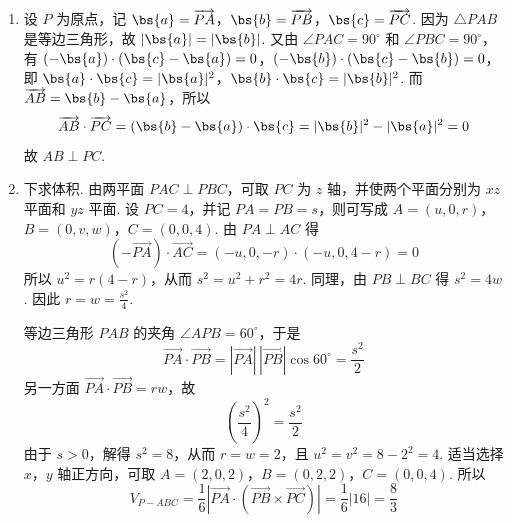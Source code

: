 \begin{solution}
\begin{enumerate}
\item 设 \(P\) 为原点，记
\(\bs{a}=\overrightarrow{PA}\)，\(\bs{b}=\overrightarrow{PB}\)，\(\bs{c}=\overrightarrow{PC}\).
因为 \(\triangle PAB\) 是等边三角形，故 \(|\bs{a}|=|\bs{b}|\). 又由 \(\angle PAC=90^{\circ}\) 和 \(\angle PBC=90^{\circ}\)，有
\((-\bs{a})\cdot(\bs{c}-\bs{a})=0\)，\((-\bs{b})\cdot(\bs{c}-\bs{b})=0\)，
即
\(\bs{a}\cdot\bs{c}=|\bs{a}|^2\)，\(\bs{b}\cdot\bs{c}=|\bs{b}|^2\).
而 \(\overrightarrow{AB}=\bs{b}-\bs{a}\)，所以
\[
\overrightarrow{AB}\cdot\overrightarrow{PC}=(\bs{b}-\bs{a})\cdot\bs{c}=|\bs{b}|^2-|\bs{a}|^2=0
\]
故 \(AB\perp PC\).

\item 下求体积. 由两平面 \(PAC\perp PBC\)，可取 \(PC\) 为 \(z\) 轴，并使两个平面分别为 \(xz\) 平面和 \(yz\) 平面. 设 \(PC=4\)，并记 \(PA=PB=s\)，则可写成
\(A=(u,0,r)\)，\(B=(0,v,w)\)，\(C=(0,0,4)\).
由 \(PA\perp AC\) 得
\[
(-\overrightarrow{PA})\cdot\overrightarrow{AC}=(-u,0,-r)\cdot(-u,0,4-r)=0
\]
所以 \(u^2=r(4-r)\)，从而 \(s^2=u^2+r^2=4r\). 同理，由 \(PB\perp BC\) 得 \(s^2=4w\). 因此 \(r=w=\frac{s^2}{4}\).

等边三角形 \(PAB\) 的夹角 \(\angle APB=60^{\circ}\)，于是
\[
\overrightarrow{PA}\cdot\overrightarrow{PB}=|\overrightarrow{PA}|\,|\overrightarrow{PB}|\cos60^{\circ}=\frac{s^2}{2}
\]
另一方面 \(\overrightarrow{PA}\cdot\overrightarrow{PB}=rw\)，故
\[
\left(\frac{s^2}{4}\right)^2=\frac{s^2}{2}
\]
由于 \(s>0\)，解得 \(s^2=8\)，从而 \(r=w=2\)，且 \(u^2=v^2=8-2^2=4\). 适当选择 \(x\)，\(y\) 轴正方向，可取
\(A=(2,0,2)\)，\(B=(0,2,2)\)，\(C=(0,0,4)\).
所以
\[
V_{P-ABC}=\frac{1}{6}\left|\overrightarrow{PA}\cdot\left(\overrightarrow{PB}\times\overrightarrow{PC}\right)\right|=\frac{1}{6}\left|16\right|=\frac{8}{3}
\]
\end{enumerate}
\end{solution}

